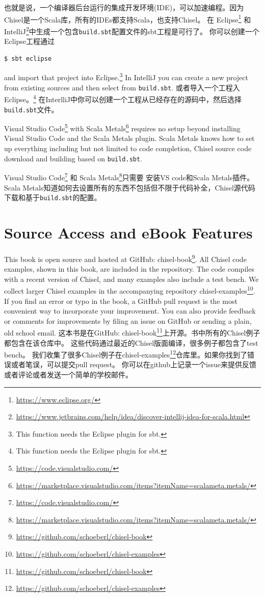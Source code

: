 \documentclass[%
    10pt,
    headinclude, footexclude,
    openright, %
    notitlepage,
    cleardoubleempty,
    headsepline,
    pointlessnumbers,
    bibtotoc, idxtotoc,
    ]{scrbook}
\newcommand{\code}[1]{{\small{\texttt{#1}}}}
\newcommand{\myref}[2]{\href{#1}{#2}}
\renewcommand{\myref}[2]{{#2}{\footnote{\url{#1}}}}
\begin{document}
也就是说，一个编译器后台运行的集成开发环境(IDE)，可以加速编程。因为Chisel是一个Scala库，所有的IDEs都支持Scala，也支持Chisel。
在 \myref{https://www.eclipse.org/}{Eclipse} 和
\myref{https://www.jetbrains.com/help/idea/discover-intellij-idea-for-scala.html}{IntelliJ}中生成一个包含\code{build.sbt}配置文件的sbt工程是可行了。
你可以创建一个Eclipse工程通过

\begin{verbatim}
$ sbt eclipse
\end{verbatim}
and import that project into Eclipse.\footnote{This function needs the Eclipse plugin for sbt.}
In IntelliJ you can create a new project from existing sources and then select from \code{build.sbt}.
或者导入一个工程入Eclipse。\footnote{This function needs the Eclipse plugin for sbt.}
在InterlliJ中你可以创建一个工程从已经存在的源码中，然后选择\code{build.sbt}文件。


\myref{https://code.visualstudio.com/}{Visual Studio Code} with
\myref{https://marketplace.visualstudio.com/items?itemName=scalameta.metals/}{Scala Metals} requires
no setup beyond installing Visual Studio Code and the Scala Metals plugin. Scala Metals knows how to
set up everything including but not limited to code completion, Chisel source code download and
building based on \code{build.sbt}.

\myref{https://code.visualstudio.com/}{Visual Studio Code} 和
\myref{https://marketplace.visualstudio.com/items?itemName=scalameta.metals/}{Scala Metals}只需要
 安装VS code和Scala Metals插件。Scala Metals知道如何去设置所有的东西不包括但不限于代码补全，Chisel源代码下载和基于\code{build.sbt}的配置。

\section{Source Access and eBook Features}

This book is open source and hosted at GitHub: \myref{https://github.com/schoeberl/chisel-book}{chisel-book}.
All Chisel code examples, shown in this book, are included in the repository.
The code compiles with a recent version of Chisel, and many examples also include a test bench.
We collect larger Chisel examples in the accompanying repository \myref{https://github.com/schoeberl/chisel-examples}{chisel-examples}. If you find an error or typo in the book, a GitHub pull request is the most convenient way to incorporate your improvement.
You can also provide feedback or comments for improvements by filing an issue on GitHub
or sending a plain, old school email.
这本书是在GitHub: \myref{https://github.com/schoeberl/chisel-book}{chisel-book}上开源。书中所有的Chisel例子都包含在该仓库中。
这些代码通过最近的Chisel版面编译，很多例子都包含了test bench。
我们收集了很多Chisel例子在\myref{https://github.com/schoeberl/chisel-examples}{chisel-examples}仓库里。如果你找到了错误或者笔误，可以提交pull request。
你可以在github上记录一个issue来提供反馈或者评论或者发送一个简单的学校邮件。
\end{document}
